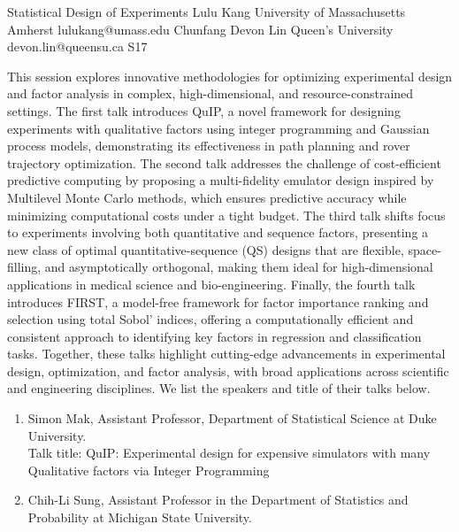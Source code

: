 \begin{session}
 {Statistical Design of Experiments}%
 {Lulu Kang}%
 {University of Massachusetts Amherst}%
 {lulukang@umass.edu}%
 {Chunfang Devon Lin}%
 {Queen's University}%
 {devon.lin@queensu.ca}%
 {S17}%
{}

 \medskip
 This session explores innovative methodologies for optimizing experimental design and factor analysis in complex, high-dimensional, and resource-constrained settings. The first talk introduces QuIP, a novel framework for designing experiments with qualitative factors using integer programming and Gaussian process models, demonstrating its effectiveness in path planning and rover trajectory optimization. The second talk addresses the challenge of cost-efficient predictive computing by proposing a multi-fidelity emulator design inspired by Multilevel Monte Carlo methods, which ensures predictive accuracy while minimizing computational costs under a tight budget. The third talk shifts focus to experiments involving both quantitative and sequence factors, presenting a new class of optimal quantitative-sequence (QS) designs that are flexible, space-filling, and asymptotically orthogonal, making them ideal for high-dimensional applications in medical science and bio-engineering. Finally, the fourth talk introduces FIRST, a model-free framework for factor importance ranking and selection using total Sobol' indices, offering a computationally efficient and consistent approach to identifying key factors in regression and classification tasks. Together, these talks highlight cutting-edge advancements in experimental design, optimization, and factor analysis, with broad applications across scientific and engineering disciplines.
 We list the speakers and title of their talks below.
 \begin{enumerate}
 \item Simon Mak, Assistant Professor, Department of Statistical Science at Duke University. \\
 Talk title: QuIP: Experimental design for expensive simulators with many Qualitative factors via Integer Programming
 \item Chih-Li Sung, Assistant Professor in the Department of Statistics and Probability at Michigan State University.\\

\end{enumerate}
\end{session}
